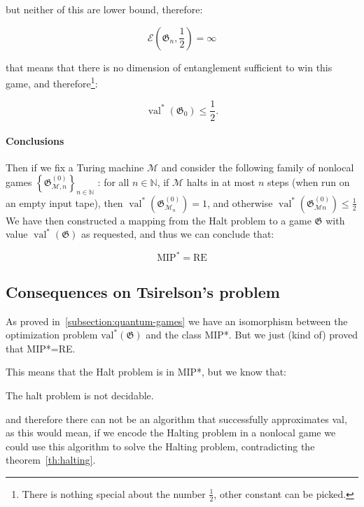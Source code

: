 but neither of this are lower bound, therefore:

\begin{equation}
    \mathscr{E}\left(\mathfrak{G}_{n}, \frac{1}{2}\right) = \infty
\end{equation}

that means that there is no dimension of entanglement sufficient to win this game, and therefore\footnote{There is nothing special about the number $\frac{1}{2}$, other constant can be picked.}:

\begin{equation}
    \operatorname{val}^{*}(\mathfrak{G}_0) \leq \frac{1}{2}.
\end{equation}
\paragraph{Conclusions}
Then if we fix a Turing machine $\mathcal{M}$ and consider the following family of nonlocal games $\left\{\mathfrak{G}_{\mathcal{M}, n}^{(0)}\right\}_{n \in \mathbb{N}}$ : for all $n \in \mathbb{N}$, if $\mathcal{M}$ halts in at most $n$ steps (when run on an empty input tape), then $\operatorname{val}^{*}\left(\mathfrak{G}_{\mathcal{M}_{n}}^{(0)}\right)=1$, and otherwise $\operatorname{val}^{*}\left(\mathfrak{G}_{\mathcal{M} n}^{(0)}\right) \leq \frac{1}{2}$
We have then constructed a mapping from the Halt problem to a game $\mathfrak{G}$ with value $\operatorname{val}^{*}(\mathfrak{G})$ as requested, and thus we can conclude that:
\begin{theorem}
\begin{equation}
\text{MIP}^{*} = \text{RE}
\end{equation}
\end{theorem}

\subsection{Consequences on Tsirelson's problem}
As proved in~\ref{subsection:quantum-games} we have an isomorphism between the optimization problem $\operatorname{val^{*}}(\mathfrak{G})$ and the class MIP*. But we just (kind of) proved that MIP*=RE.

This means that the Halt problem is in MIP*, but we know that:

\begin{theorem}\label{th:halting}
    The halt problem is not decidable.
\end{theorem}

and therefore there can not be an algorithm that successfully approximates val, as this would mean, if we encode the Halting problem in a nonlocal game we could use this algorithm to solve the Halting problem, contradicting the theorem~\ref{th:halting}.

